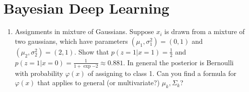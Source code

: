 \documentclass{article}
\begin{document}
\section{Bayesian Deep Learning}

\begin{enumerate}

\item Assignments in mixture of Gaussians. Suppose $x_i$ is drawn from a mixture
  of two gaussians, which have parameters $\left(\mu_{1}, \sigma_{1}^2\right) =
  \left(0, 1\right)$ and $\left(\mu_{2}, \sigma_{2}^{2}\right) = \left(2,
  1\right)$. Show that $p\left(z = 1\vert x = 1\right) = \frac{1}{2}$ and
  $p\left(z = 1 \vert x = 0\right) = \frac{1}{1 + \exp{-2}} \approx 0.881$. In
  general the posterior is Bernoulli with probability $\varphi\left(x\right)$ of
  assigning to class 1. Can you find a formula for $\varphi\left(x\right)$ that
  applies to general (or multivariate?) $\mu_{k}, \Sigma_{k}$?



\end{enumerate}
\end{document}
